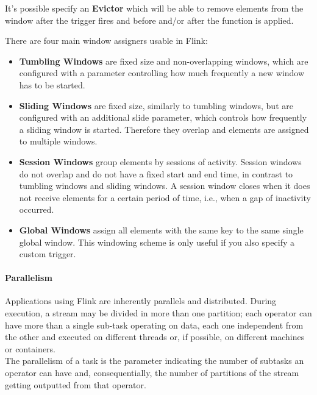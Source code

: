 It's possible specify an \textbf{Evictor} which will be able to remove elements from the window after the trigger fires and before and/or after the function is applied.

There are four main window assigners usable in Flink:

\begin{itemize}
    \item \textbf{Tumbling Windows} are fixed size and non-overlapping windows, which are configured with a parameter controlling how much frequently a new window has to be started.
    \item \textbf{Sliding Windows} are fixed size, similarly to tumbling windows, but are configured with an additional slide parameter, which controls how frequently a sliding window is started. Therefore they overlap and elements are assigned to multiple windows.
    \item \textbf{Session Windows} group elements by sessions of activity. Session windows do not overlap and do not have a fixed start and end time, in contrast to tumbling windows and sliding windows. A session window closes when it does not receive elements for a certain period of time, i.e., when a gap of inactivity occurred.
    \item \textbf{Global Windows} assign all elements with the same key to the same single global window. This windowing scheme is only useful if you also specify a custom trigger. 
\end{itemize}



\paragraph{Parallelism} \label{ParallelismFlink}

Applications using Flink are inherently parallels and distributed. During execution, a stream may be divided in more than one partition; each operator can have more than a single sub-task operating on data, each one independent from the other and executed on different threads or, if possible, on different machines or containers.\\
The parallelism of a task is the parameter indicating the number of subtasks an operator can have and, consequentially, the number of partitions of the stream getting outputted from that operator.\\

